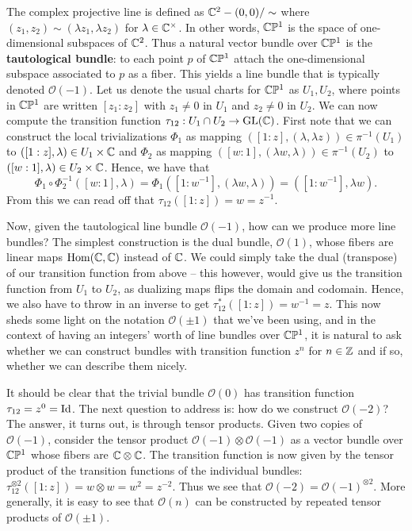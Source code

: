 \documentclass{../../mathnotes}
\begin{document}
The complex projective line is defined as $\mathbb{C}^2-(0,0)/\sim$ where $(z_1,z_2)\sim (\lambda z_1,\lambda z_2)$ for $\lambda\in\mathbb{C}^\times$. In other words, $\mathbb{C}\mathbb{P}^1$
is the space of one-dimensional subspaces of $\mathbb{C}^2$. Thus a natural vector bundle over $\mathbb{C}\mathbb{P}^1$ is the \textbf{tautological bundle}:
to each point $p$ of $\mathbb{C}\mathbb{P}^1$ attach the one-dimensional subspace associated to $p$ as a fiber. This yields a line bundle that is typically
denoted $\mathcal{O}(-1)$. 
Let us denote the usual charts for $\mathbb{C}\mathbb{P}^1$ as $U_1,U_2$, where points in $\mathbb{C}\mathbb{P}^1$ are written $[z_1:z_2]$ with $z_1\neq 0$ in $U_1$
and $z_2\neq 0$ in $U_2$. We can now compute the transition function $\tau_{12}:U_1\cap U_2\to\text{GL}(\mathbb{C})$. First note that we can construct
the local trivializations $\Phi_1$ as mapping $\left( [1:z], (\lambda, \lambda z) \right)\in\pi^{-1}(U_1)$ to $([1:z], \lambda)\in U_1\times\mathbb{C}$
and $\Phi_2$ as mapping $\left( [w:1], (\lambda w, \lambda) \right)\in\pi^{-1}(U_2)$ to $([w:1], \lambda)\in U_2\times\mathbb{C}$. Hence, we have that
\[\Phi_1\circ\Phi_2^{-1}\left( [w:1],\lambda \right)=\Phi_1\left( [1:w^{-1}], (\lambda w,\lambda) \right)=([1:w^{-1}],\lambda w).\]
From this we can read off that $\tau_{12}([1:z])=w=z^{-1}$.

Now, given the tautological line bundle $\mathcal{O}(-1)$, how can we produce more line bundles? The simplest construction is the dual bundle,
$\mathcal{O}(1)$, whose fibers are linear maps $\operatorname{Hom}(\mathbb{C},\mathbb{C})$ instead of $\mathbb{C}$. We could simply take the dual (transpose) of our transition function
from above -- this however, would give us the transition function from $U_1$ to $U_2$, as dualizing maps flips the domain and codomain. Hence, we also have
to throw in an inverse to get $\tau^*_{12}([1:z])=w^{-1}=z$. This now sheds some light on the notation $\mathcal{O}(\pm 1)$ that we've been using, and in
the context of having an integers' worth of line bundles over $\mathbb{C}\mathbb{P}^1$, it is natural to ask whether we can construct bundles with transition function
$z^n$ for $n\in\mathbb{Z}$ and if so, whether we can describe them nicely.

It should be clear that the trivial bundle $\mathcal{O}(0)$ has transition function $\tau_{12}=z^0=\operatorname{Id}$. The next question to address is:
how do we construct $\mathcal{O}(-2)$? The answer, it turns out, is through tensor products. Given two copies of $\mathcal{O}(-1)$,
consider the tensor product $\mathcal{O}(-1)\otimes\mathcal{O}(-1)$ as a vector bundle over $\mathbb{C}\mathbb{P}^1$ whose fibers are $\mathbb{C}\otimes\mathbb{C}$. The transition
function is now given by the tensor product of the transition functions of the individual bundles: $\tau^{\otimes 2}_{12}([1:z])=w\otimes w=w^2=z^{-2}$.
Thus we see that $\mathcal{O}(-2)=\mathcal{O}(-1)^{\otimes 2}$. More generally, it is easy to see that $\mathcal{O}(n)$ can be constructed 
by repeated tensor products of $\mathcal{O}(\pm 1)$.
\end{document}
